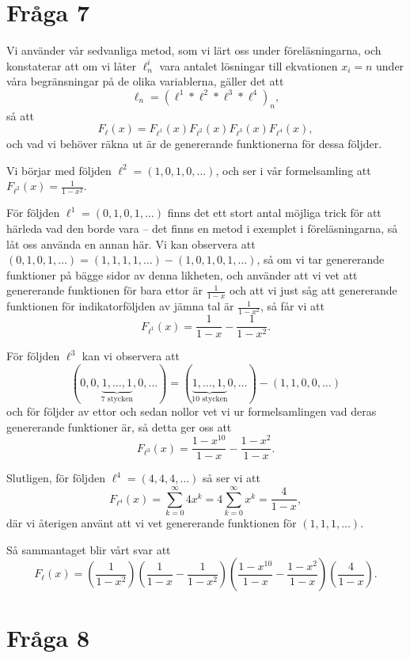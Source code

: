 \documentclass[nobib]{tufte-handout}
\begin{document}
\section{Fråga 7}

Vi använder vår sedvanliga metod, som vi lärt oss under föreläsningarna, och konstaterar att om vi låter $\ell^i_n$ vara antalet lösningar till ekvationen $x_i = n$ under våra begränsningar på de olika variablerna, gäller det att
$$\ell_n = (\ell^1 * \ell^2 * \ell^3 * \ell^4)_n,$$
så att
$$F_\ell(x) = F_{\ell^1}(x)F_{\ell^2}(x)F_{\ell^3}(x)F_{\ell^4}(x),$$
och vad vi behöver räkna ut är de genererande funktionerna för dessa följder.

Vi börjar med följden $\ell^2 = (1,0,1,0,\ldots)$, och ser i vår formelsamling att $F_{\ell^2}(x) = \frac{1}{1 - x^2}$.

För följden $\ell^1 = (0,1,0,1,\ldots)$ finns det ett stort antal möjliga trick för att härleda vad den borde vara -- det finns en metod i exemplet i föreläsningarna, så låt oss använda en annan här. Vi kan observera att $(0,1,0,1,\ldots) = (1,1,1,1,\ldots) - (1,0,1,0,1,\ldots)$, så om vi tar genererande funktioner på bägge sidor av denna likheten, och använder att vi vet att genererande funktionen för bara ettor är $\frac{1}{1-x}$ och att vi just såg att genererande funktionen för indikatorföljden av jämna tal är $\frac{1}{1 - x^2}$, så får vi att
$$F_{\ell^1}(x) = \frac{1}{1 - x} - \frac{1}{1 - x^2}.$$

För följden $\ell^3$ kan vi observera att
$$(0,0,\underbrace{1,\ldots,1}_{7\text{ stycken}},0,\ldots) = (\underbrace{1,\ldots,1,}_{10\text{ stycken}}0,\ldots) - (1,1,0,0,\ldots)$$
och för följder av ettor och sedan nollor vet vi ur formelsamlingen vad deras genererande funktioner är, så detta ger oss att
$$F_{\ell^3}(x) = \frac{1 - x^{10}}{1-x} - \frac{1 - x^2}{1 - x}.$$

Slutligen, för följden $\ell^4 = (4,4,4,\ldots)$ så ser vi att
$$F_{\ell^4}(x) = \sum_{k=0}^{\infty} 4 x^k = 4 \sum_{k=0}^{\infty} x^k = \frac{4}{1 - x},$$
där vi återigen använt att vi vet genererande funktionen för $(1,1,1,\ldots)$.

Så sammantaget blir vårt svar att
$$F_\ell(x) = \left(\frac{1}{1 - x^2}\right)\left(\frac{1}{1 - x} - \frac{1}{1 - x^2}\right)\left(\frac{1 - x^{10}}{1-x} - \frac{1 - x^2}{1 - x}\right)\left(\frac{4}{1 - x}\right).$$

\section{Fråga 8}
\end{document}
